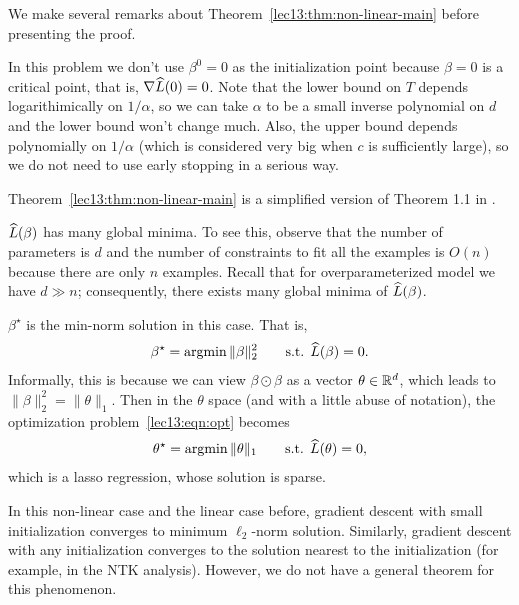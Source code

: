 We make several remarks about Theorem~\ref{lec13:thm:non-linear-main} before presenting the proof.

\begin{remark}
In this problem we don't use $\beta^0=0$ as the initialization point because $\beta=0$ is a critical point, that is, $\nabla\widehat{L}(0)=0$. Note that the lower bound on $T$ depends logarithimically on $1/\alpha$, so we can take $\alpha$ to be a small inverse polynomial on $d$ and the lower bound won't change much. Also, the upper bound depends polynomially on $1/\alpha$ (which is considered very big when $c$ is sufficiently large), so we do not need to use early stopping in a serious way.
\end{remark}

\begin{remark}
Theorem~\ref{lec13:thm:non-linear-main} is a simplified version of Theorem 1.1 in \cite{li2018algorithmic}.
\end{remark}

\begin{remark}
$\widehat{L}(\beta)$ has many global minima. To see this, observe that the number of parameters is $d$ and the number of constraints to fit all the examples is $O(n)$ because there are only $n$ examples. Recall that for overparameterized model we have $d\gg n$; consequently, there exists many global minima of $\widehat{L}(\beta)$.
\end{remark}

\begin{remark}
$\beta^\star$ is the min-norm solution in this case. That is,
    \begin{align}\label{lec13:eqn:opt}
        \beta^\star=\operatorname*{\textup{argmin}} \|\beta\|_2^2\qquad \text{s.t. }\widehat{L}(\beta)=0.
    \end{align}
    Informally, this is because we can view $\beta\odot \beta$ as a vector $\theta\in \mathbb R^{d}$, which leads to $\|\beta\|_2^2 =\|\theta\|_1.$ Then in the $\theta$ space (and with a little abuse of notation), the optimization problem~\eqref{lec13:eqn:opt} becomes
    \begin{align}\label{lec13:eqn:opt-theta}
        \theta^\star=\operatorname*{\textup{argmin}} \|\theta\|_1 \qquad \text{s.t. }\widehat{L}(\theta)=0,
    \end{align}
    which is a lasso regression, whose solution is sparse.
\end{remark}

\begin{remark}    
In this non-linear case and the linear case before, gradient descent with small initialization converges to minimum $\ell_2$-norm solution. Similarly, gradient descent with any initialization converges to the solution nearest to the initialization (for example, in the NTK analysis). However, we do not have a general theorem for this phenomenon. 
\end{remark}

